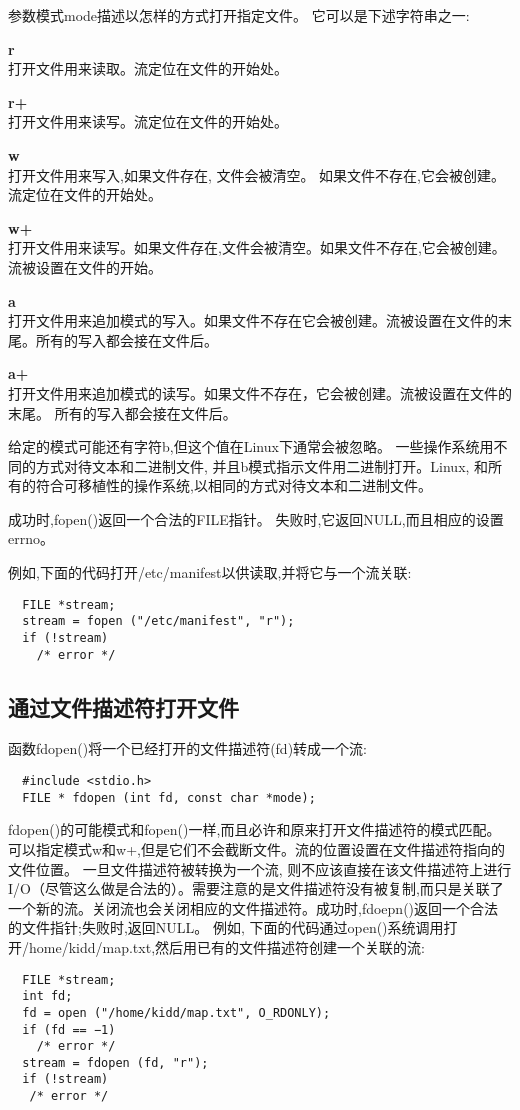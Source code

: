 参数模式mode描述以怎样的方式打开指定文件。 它可以是下述字符串之一:
\begin{list}{}
\item \textbf{r}\\
   打开文件用来读取。流定位在文件的开始处。
\item \textbf{r+}\\
   打开文件用来读写。流定位在文件的开始处。
\item \textbf{w}\\
   打开文件用来写入,如果文件存在, 文件会被清空。 如果文件不存在,它会被创建。流定位在文件的开始处。
\item \textbf{w+}\\
   打开文件用来读写。如果文件存在,文件会被清空。如果文件不存在,它会被创建。流被设置在文件的开始。
\item \textbf{a}\\
   打开文件用来追加模式的写入。如果文件不存在它会被创建。流被设置在文件的末尾。所有的写入都会接在文件后。
\item \textbf{a+}\\
   打开文件用来追加模式的读写。如果文件不存在，它会被创建。流被设置在文件的末尾。 所有的写入都会接在文件后。
\end{list}
给定的模式可能还有字符b,但这个值在Linux下通常会被忽略。 一些操作系统用不同的方式对待文本和二进制文件, 并且b模式指示文件用二进制打开。Linux, 和所有的符合可移植性的操作系统,以相同的方式对待文本和二进制文件。

成功时,fopen()返回一个合法的FILE指针。 失败时,它返回NULL,而且相应的设置errno。

例如,下面的代码打开/etc/manifest以供读取,并将它与一个流关联:
\begin{lstlisting}
  FILE *stream;
  stream = fopen ("/etc/manifest", "r");
  if (!stream)
    /* error */
\end{lstlisting}


\subsection{通过文件描述符打开文件}

函数fdopen()将一个已经打开的文件描述符(fd)转成一个流:
\begin{lstlisting}
  #include <stdio.h>
  FILE * fdopen (int fd, const char *mode);
\end{lstlisting}

fdopen()的可能模式和fopen()一样,而且必许和原来打开文件描述符的模式匹配。可以指定模式w和w+,但是它们不会截断文件。流的位置设置在文件描述符指向的文件位置。 一旦文件描述符被转换为一个流, 则不应该直接在该文件描述符上进行I/O（尽管这么做是合法的）。需要注意的是文件描述符没有被复制,而只是关联了一个新的流。关闭流也会关闭相应的文件描述符。成功时,fdoepn()返回一个合法的文件指针;失败时,返回NULL。 例如, 下面的代码通过open()系统调用打开/home/kidd/map.txt,然后用已有的文件描述符创建一个关联的流:
\begin{lstlisting}
  FILE *stream;
  int fd;
  fd = open ("/home/kidd/map.txt", O_RDONLY);
  if (fd == −1)
    /* error */
  stream = fdopen (fd, "r");
  if (!stream)
   /* error */
\end{lstlisting}


